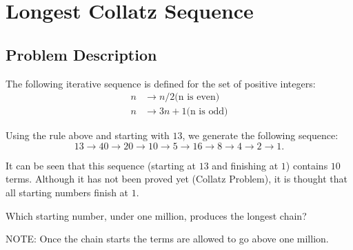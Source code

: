 \section{Longest Collatz Sequence}
\subsection{Problem Description}
The following iterative sequence is defined for the set of positive integers:
\begin{align*}
	n& \to n/2 \text{(n is even)} \\
	n& \to 3n + 1 \text{(n is odd)}
\end{align*}

Using the rule above and starting with $13$, we generate the following sequence:
$$13 \to 40 \to 20 \to 10 \to 5 \to 16 \to 8 \to 4 \to 2 \to 1.$$

It can be seen that this sequence (starting at $13$ and finishing at $1$) contains $10$ terms. Although it has not been proved yet (Collatz Problem), it is thought that all starting numbers finish at $1$.

Which starting number, under one million, produces the longest chain?

NOTE: Once the chain starts the terms are allowed to go above one million.
